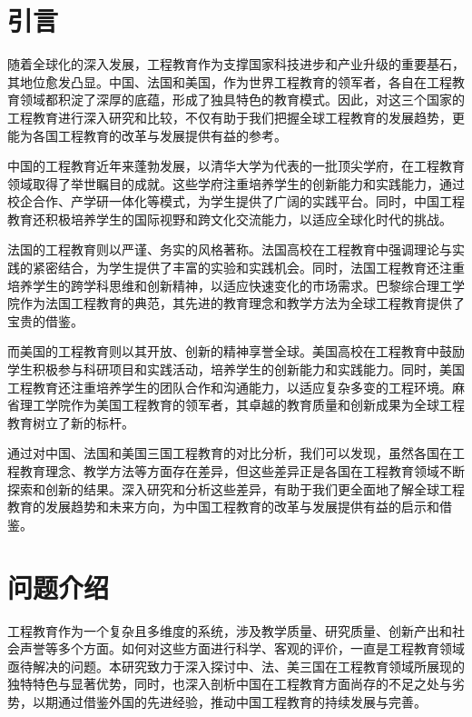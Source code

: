 \documentclass{mcmthesis}
\begin{document}
\section{引言}
随着全球化的深入发展，工程教育作为支撑国家科技进步和产业升级的重要基石，其地位愈发凸显。中国、法国和美国，作为世界工程教育的领军者，各自在工程教育领域都积淀了深厚的底蕴，形成了独具特色的教育模式。因此，对这三个国家的工程教育进行深入研究和比较，不仅有助于我们把握全球工程教育的发展趋势，更能为各国工程教育的改革与发展提供有益的参考。 \par
中国的工程教育近年来蓬勃发展，以清华大学为代表的一批顶尖学府，在工程教育领域取得了举世瞩目的成就。这些学府注重培养学生的创新能力和实践能力，通过校企合作、产学研一体化等模式，为学生提供了广阔的实践平台。同时，中国工程教育还积极培养学生的国际视野和跨文化交流能力，以适应全球化时代的挑战。 \par
法国的工程教育则以严谨、务实的风格著称。法国高校在工程教育中强调理论与实践的紧密结合，为学生提供了丰富的实验和实践机会。同时，法国工程教育还注重培养学生的跨学科思维和创新精神，以适应快速变化的市场需求。巴黎综合理工学院作为法国工程教育的典范，其先进的教育理念和教学方法为全球工程教育提供了宝贵的借鉴。 \par
而美国的工程教育则以其开放、创新的精神享誉全球。美国高校在工程教育中鼓励学生积极参与科研项目和实践活动，培养学生的创新能力和实践能力。同时，美国工程教育还注重培养学生的团队合作和沟通能力，以适应复杂多变的工程环境。麻省理工学院作为美国工程教育的领军者，其卓越的教育质量和创新成果为全球工程教育树立了新的标杆。\par
通过对中国、法国和美国三国工程教育的对比分析，我们可以发现，虽然各国在工程教育理念、教学方法等方面存在差异，但这些差异正是各国在工程教育领域不断探索和创新的结果。深入研究和分析这些差异，有助于我们更全面地了解全球工程教育的发展趋势和未来方向，为中国工程教育的改革与发展提供有益的启示和借鉴。\par

\section{问题介绍}
工程教育作为一个复杂且多维度的系统，涉及教学质量、研究质量、创新产出和社会声誉等多个方面。如何对这些方面进行科学、客观的评价，一直是工程教育领域亟待解决的问题。本研究致力于深入探讨中、法、美三国在工程教育领域所展现的独特特色与显著优势，同时，也深入剖析中国在工程教育方面尚存的不足之处与劣势，以期通过借鉴外国的先进经验，推动中国工程教育的持续发展与完善。\par
\end{document}
